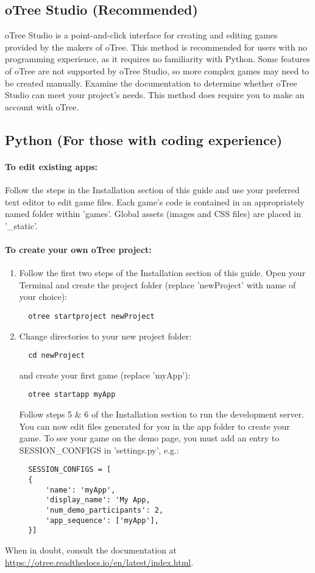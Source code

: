 \documentclass{article}
\begin{document}
		\subsection{oTree Studio (Recommended)}
			oTree Studio is a point-and-click interface for creating and editing games provided by the makers of oTree. This method is recommended for users with no programming experience, as it requires no familiarity with Python. Some features of oTree are not supported by oTree Studio, so more complex games may need to be created manually. Examine the documentation to determine whether oTree Studio can meet your project's needs. This method does require you to make an account with oTree.
		
		\subsection{Python (For those with coding experience)}
			\paragraph{To edit existing apps:} Follow the steps in the Installation section of this guide and use your preferred text editor to edit game files. Each game's code is contained in an appropriately named folder within 'games'. Global assets (images and CSS files) are placed in '\_static'.
			\paragraph{To create your own oTree project:} 
				\begin{enumerate}
					\item Follow the first two steps of the Installation section of this guide. Open your Terminal and create the project folder (replace 'newProject' with name of your choice):
					 \begin{lstlisting}
  otree startproject newProject
					 \end{lstlisting}
					 \item Change directories to your new project folder:
					 \begin{lstlisting}
  cd newProject
					 \end{lstlisting}
					 and create your first game (replace 'myApp'):
					 \begin{lstlisting}
  otree startapp myApp
					 \end{lstlisting}
					 Follow steps 5 \& 6 of the Installation section to run the development server. You can now edit files generated for you in the app folder to create your game. To see your game on the demo page, you must add an entry to SESSION\_CONFIGS in 'settings.py', e.g.:
					 \begin{lstlisting}
  SESSION_CONFIGS = [
  {
      'name': 'myApp',
      'display_name': 'My App,
      'num_demo_participants': 2,
      'app_sequence': ['myApp'],
  }]
					 \end{lstlisting}
					 \end{enumerate}
					 When in doubt, consult the documentation at \url{https://otree.readthedocs.io/en/latest/index.html}.
	  
\end{document}
